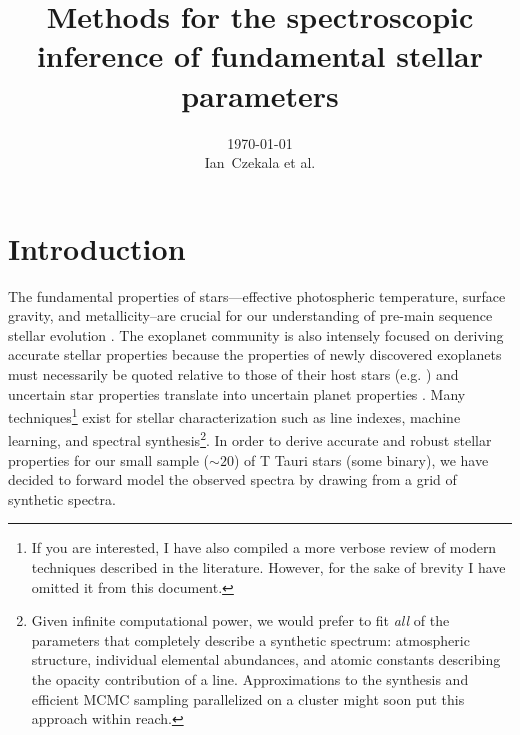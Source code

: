 \documentclass[preprint]{aastex} %
\begin{document}
\title{Methods for the spectroscopic inference of fundamental stellar parameters}
\author{\today{}\\
\medskip
Ian~Czekala et al.
}


\section{Introduction}
The fundamental properties of stars---effective photospheric temperature, surface gravity, and metallicity--are crucial for our understanding of pre-main sequence stellar evolution \citep{dm97, bca+02}. The exoplanet community is also intensely focused on deriving accurate stellar properties because the properties of newly discovered exoplanets must necessarily be quoted relative to those of their host stars (e.g. \citealt{tfs+12,blj+12,ssm+13}) and uncertain star properties translate into uncertain planet properties \citep{kan14}. Many techniques\footnote{If you are interested, I have also compiled a more verbose review of modern techniques described in the literature. However, for the sake of brevity I have omitted it from this document.} exist for stellar characterization such as line indexes, machine learning, and spectral synthesis\footnote{Given infinite computational power, we would prefer to fit \emph{all} of the parameters that completely describe a synthetic spectrum: atmospheric structure, individual elemental abundances, and atomic constants describing the opacity contribution of a line. Approximations to the synthesis and efficient MCMC sampling parallelized on a cluster might soon put this approach within reach.}. In order to derive accurate and robust stellar properties for our small sample ($\sim 20$) of T Tauri stars (some binary), we have decided to forward model the observed spectra by drawing from a grid of synthetic spectra.
\end{document}
